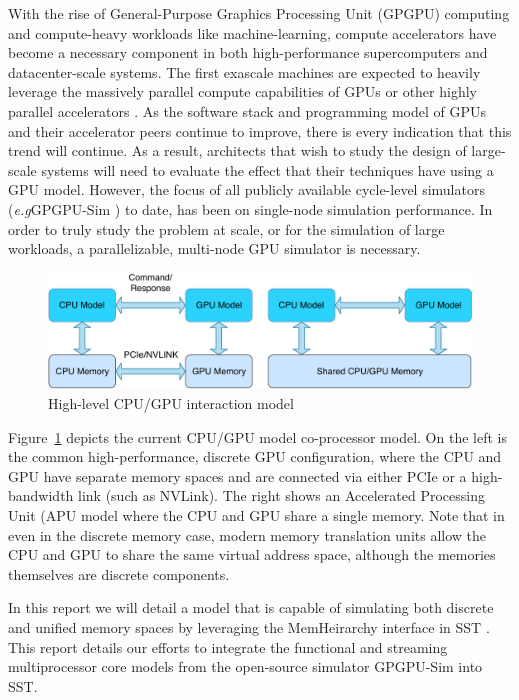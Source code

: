 With the rise of General-Purpose Graphics Processing Unit (GPGPU) computing and
compute-heavy workloads like machine-learning, compute accelerators have become
a necessary component in both high-performance supercomputers and
datacenter-scale systems. The first exascale machines are expected to heavily
leverage the massively parallel compute capabilities of GPUs or other highly
parallel accelerators \cite{snl_roadmap}. As the software stack and programming model of GPUs and
their accelerator peers continue to improve, there is every indication that
this trend will continue. As a result, architects that wish to study the design
of large-scale systems will need to evaluate the effect that their techniques have
using a GPU model. However, the focus of all publicly available cycle-level
simulators ({\em e.g}GPGPU-Sim \cite{gpgpu_sim}) to date, has been on single-node
simulation performance. In order to truly study
the problem at scale, or for the simulation of large workloads, a parallelizable,
multi-node GPU simulator is necessary.

   \begin{figure}[!htb]
      \centering
      \setlength{\abovecaptionskip}{6pt plus 1pt minus 1pt}
      \includegraphics[width=.85\textwidth,keepaspectratio]{figures/cpu_gpu_model.pdf}
      \captionsetup{width=.75\textwidth}
      \caption{High-level CPU/GPU interaction model}
      \label{fig:model}
   \end{figure}

Figure~\ref{fig:model} depicts the current CPU/GPU model co-processor model.
On the left is the common high-performance, discrete GPU configuration, where the CPU
and GPU have separate memory spaces and are connected via either PCIe or a
high-bandwidth link (such as NVLink). The right shows an Accelerated Processing Unit (APU
 model where the CPU
and GPU share a single memory. Note that in even in the discrete memory case, modern
memory translation units allow the CPU and GPU to share the same virtual address space,
although the memories themselves are discrete components.

In this report we will detail a model that is capable of simulating both
discrete and unified memory spaces by leveraging the MemHeirarchy interface in
SST \cite{sst}. This report details our efforts to integrate the functional and streaming
multiprocessor core models from the open-source simulator GPGPU-Sim into SST.
